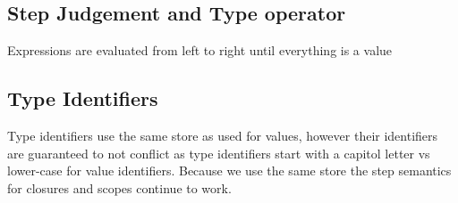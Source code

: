 \documentclass{article}
\begin{document}
\subsection{Step Judgement and Type operator}
Expressions are evaluated from left to right until everything is a value
{
    \centering
    \def \MathparLineskip {\lineskip=0.43cm}
}

\subsection{Type Identifiers}
Type identifiers use the same store as used for values, however their identifiers are guaranteed to not conflict as type identifiers start with a capitol letter vs lower-case for value identifiers. Because we use the same store the step semantics for closures and scopes continue to work.
{
    \centering
    \def \MathparLineskip{\lineskip=0.43cm}
}
\end{document}
